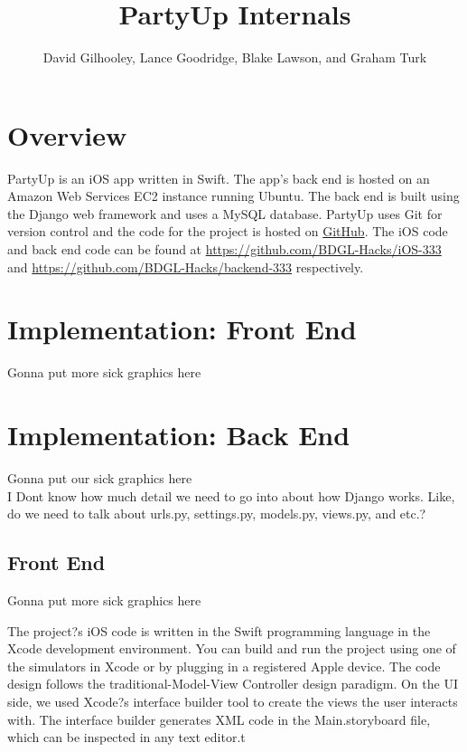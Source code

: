\documentclass[12pt]{article}
\title{PartyUp Internals}
\author{David Gilhooley, Lance Goodridge, Blake Lawson, and Graham Turk}
\begin{document}
\pagestyle{plain}

\maketitle

\section{Overview}

PartyUp is an iOS app written in Swift.
The app's back end is hosted on an Amazon Web Services
EC2 instance running Ubuntu.
The back end is built using the Django web framework and uses
a MySQL database.
PartyUp uses Git for version control and the code for the project is 
hosted on \href{https://github.com/}{GitHub}.
The iOS code and back end code can be found at 
\url{https://github.com/BDGL-Hacks/iOS-333} and
\url{https://github.com/BDGL-Hacks/backend-333} respectively.


\section{Implementation: Front End}

Gonna put more sick graphics here

\section{Implementation: Back End}

Gonna put our sick graphics here \\
I Dont know how much detail we need to go into about how
Django works. Like, do we need to talk about urls.py, settings.py,
models.py, views.py, and etc.?

\subsection{Front End}

Gonna put more sick graphics here

The project?s iOS code is written in the Swift programming language in the Xcode development environment. You can build and run the project using one of the simulators in Xcode or by plugging in a registered Apple device. The code design follows the traditional-Model-View Controller design paradigm. On the UI side, we used Xcode?s interface builder tool to create the views the user interacts with. The interface builder generates XML code in the Main.storyboard file, which can be inspected in any text editor.t
\end{document}
